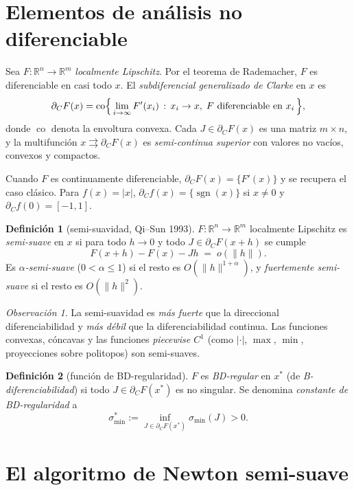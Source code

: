 \documentclass[12pt]{book}
\newcommand{\R}{\mathbb{R}}
\newcommand{\subdiff}{\partial}
\newcommand{\co}{\operatorname{co}}
\DeclareMathOperator{\sign}{sgn}
\theoremstyle{definition}
\newtheorem{definicion}{Definición}[section]
\theoremstyle{plain}
\theoremstyle{remark}
\newtheorem{observacion}{Observación}[section]
\begin{document}
\section{Elementos de análisis no diferenciable}\label{sec:prelim}

Sea $F:\R^n\to\R^m$ \emph{localmente Lipschitz}.  Por el teorema de
Rademacher, $F$ es diferenciable en casi todo $x$.  El
\emph{subdiferencial generalizado de Clarke} en $x$ es
\[
  \subdiff_C F(x)
  =\co
  \Bigl\{\, \lim_{i\to\infty} F'(x_i)\,:\,
  x_i\to x,\; F \text{ diferenciable en } x_i \,\Bigr\},
\]
donde $\co$ denota la envoltura convexa.  Cada $J\in\subdiff_C F(x)$
es una matriz $m\times n$, y la multifunción $x\rightrightarrows
\subdiff_C F(x)$ es \emph{semi-continua superior} con valores
no vacíos, convexos y compactos.

Cuando $F$ es continuamente diferenciable,
$\subdiff_C F(x)=\{F'(x)\}$ y se recupera el caso clásico.  Para
$f(x)=|x|$, $\subdiff_C f(x)=\{\sign(x)\}$ si $x\neq0$ y
$\subdiff_C f(0)=[-1,1]$.

\begin{definicion}[semi-suavidad, Qi--Sun 1993]
  $F:\R^n\to\R^m$ localmente Lipschitz es \emph{semi-suave} en $x$
  si para todo $h\to0$ y todo $J\in\subdiff_C F(x+h)$ se cumple
  \[
    \boxed{\;
    F(x+h)-F(x)-Jh \;=\; o(\|h\|).
    \;}
  \]
  Es \emph{$\alpha$-semi-suave} ($0<\alpha\le1$) si el resto es
  $O(\|h\|^{1+\alpha})$, y \emph{fuertemente semi-suave} si el resto
  es $O(\|h\|^2)$.
\end{definicion}

\begin{observacion}
  La semi-suavidad es \emph{más fuerte} que la direccional
  diferenciabilidad y \emph{más débil} que la diferenciabilidad
  continua.  Las funciones convexas, cóncavas y las funciones
  \emph{piecewise $C^1$} (como $|\cdot|$, $\max$, $\min$,
  proyecciones sobre politopos) son semi-suaves.
\end{observacion}

\begin{definicion}[función de BD-regularidad]
  $F$ es \emph{BD-regular} en $x^*$ (de \emph{B-diferenciabilidad})
  si todo $J\in\subdiff_C F(x^*)$ es no singular.  Se denomina
  \emph{constante de BD-regularidad} a
  \[
    \sigma_{\min}^{\!*}:=\inf_{J\in\subdiff_C F(x^*)}\sigma_{\min}(J)>0.
  \]
\end{definicion}

\section{El algoritmo de Newton semi-suave}\label{sec:algoritmo}
\end{document}
